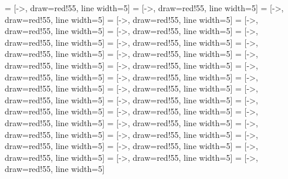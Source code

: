  = [->, draw=red!55, line width=5]
 = [->, draw=red!55, line width=5]
 = [->, draw=red!55, line width=5]
 = [->, draw=red!55, line width=5]
 = [->, draw=red!55, line width=5]
 = [->, draw=red!55, line width=5]
 = [->, draw=red!55, line width=5]
 = [->, draw=red!55, line width=5]
 = [->, draw=red!55, line width=5]
 = [->, draw=red!55, line width=5]
 = [->, draw=red!55, line width=5]
 = [->, draw=red!55, line width=5]
 = [->, draw=red!55, line width=5]
 = [->, draw=red!55, line width=5]
 = [->, draw=red!55, line width=5]
 = [->, draw=red!55, line width=5]
 = [->, draw=red!55, line width=5]
 = [->, draw=red!55, line width=5]
 = [->, draw=red!55, line width=5]
 = [->, draw=red!55, line width=5]
 = [->, draw=red!55, line width=5]
 = [->, draw=red!55, line width=5]
 = [->, draw=red!55, line width=5]
 = [->, draw=red!55, line width=5]
 = [->, draw=red!55, line width=5]
 = [->, draw=red!55, line width=5]
 = [->, draw=red!55, line width=5]
 = [->, draw=red!55, line width=5]
 = [->, draw=red!55, line width=5]





